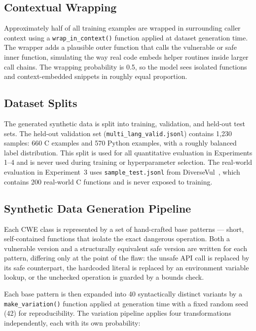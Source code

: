\subsection{Contextual Wrapping}

Approximately half of all training examples are wrapped in surrounding caller context using a
\texttt{wrap\_in\_context()} function applied at dataset generation time.
The wrapper adds a plausible outer function that calls the vulnerable or safe inner function,
simulating the way real code embeds helper routines inside larger call chains.
The wrapping probability is 0.5, so the model sees isolated functions and context-embedded
snippets in roughly equal proportion.

\subsection{Dataset Splits}

The generated synthetic data is split into training, validation, and held-out test sets.
The held-out validation set (\texttt{multi\_lang\_valid.jsonl}) contains 1{,}230 samples:
660 C examples and 570 Python examples, with a roughly balanced label distribution.
This split is used for all quantitative evaluation in Experiments 1--4 and is never used
during training or hyperparameter selection.
The real-world evaluation in Experiment~3 uses \texttt{sample\_test.jsonl} from
DiverseVul~\cite{ni2023diversevul}, which contains 200 real-world C functions and is
never exposed to training.

\subsection{Synthetic Data Generation Pipeline}

Each CWE class is represented by a set of hand-crafted base patterns --- short,
self-contained functions that isolate the exact dangerous operation.
Both a vulnerable version and a structurally equivalent safe version are written for each
pattern, differing only at the point of the flaw: the unsafe API call is replaced by its
safe counterpart, the hardcoded literal is replaced by an environment variable lookup,
or the unchecked operation is guarded by a bounds check.

Each base pattern is then expanded into 40 syntactically distinct variants by a
\texttt{make\_variation()} function applied at generation time with a fixed random seed
(42) for reproducibility.
The variation pipeline applies four transformations independently, each with its own
probability:

